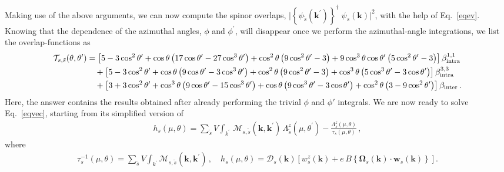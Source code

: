 \documentclass[aps,prb,onecolumn,nofootinbib,citeautoscript,10pt, showkeys]{revtex4-2}
\def \nn{\nonumber \\}
\begin{document}
Making use of the above arguments, we can now compute the spinor overlaps, $\big \vert \left \lbrace  \psi_{\tilde s }({ \boldsymbol k^\prime }) \right \rbrace^\dagger \; \psi_{s}({ \boldsymbol k}) \big \vert^2 $, with the help of Eq.~\eqref{eqev}. Knowing that the dependence of the azimuthal angles, $\phi$ and $\phi^\prime $, will disappear once we perform the azimuthal-angle integrations, we list the
overlap-functions as
\begin{align}
\label{eqoverlap}
{\mathcal T }_{ s, \tilde s} (\theta, \theta^\prime)
& = \left[  5 -3 \cos^2 \theta^\prime 
+ \cos  \theta  \left(17 \cos  \theta^\prime  -
27 \cos^3 \theta^\prime  \right)+\cos^2 \theta  
\left(9 \cos^2 \theta^\prime  -3\right) 
  +9 \cos^3 \theta  \cos  \theta^\prime   \left(5 \cos^2 \theta^\prime  -3\right)
    \right ] \beta_{\rm intra}^{1,1} \nn & \quad
+ \left[ 5 - 3\cos^2 \theta^\prime
+\cos  \theta  \left(9 \cos\theta^\prime  -3 \cos^3 \theta^\prime  \right)
+ \cos^2 \theta  \left(9 \cos^2 \theta^\prime  -3\right)
+ \cos^3 \theta  \left(5 \cos^3 \theta^\prime  -3 \cos  \theta^\prime  \right)  
\right ] \beta_{\rm intra}^{3,3} \nn & \quad
+ \left[ 3 + 3\cos^2 \theta^\prime  
+ \cos^3 \theta  \left(9 \cos  \theta^\prime  -15 \cos^3 \theta^\prime  \right)
+\cos  \theta  \left(9 \cos^3 \theta^\prime  -3 \cos  \theta^\prime  \right)
   +\cos^2 \theta  \left(3-9 \cos^2 \theta^\prime  \right)  
 \right ]  \beta_{\rm inter}\,.
\end{align}
Here, the answer contains the results obtained after already performing the trivial $\phi$ and $ \phi'$ integrals. We are now ready to solve Eq.~\eqref{eqvec}, starting from its simplified version of
\begin{align}
\label{eq_lambda_mu}
h_s (\mu, \theta) = 
 \sum_{\tilde s} V  
\int_{k^\prime }\, \mathcal{M}_{ s, \tilde s} 
(\boldsymbol k,\boldsymbol k^\prime)
\, {\Lambda}^z_{\tilde s} ( \mu, \theta^\prime ) 
 - \frac{ {\Lambda}^z_s  (\mu, \theta)} 
{\tau_s(\mu, \theta)}  \,,
\end{align}
where
\begin{align}
\label{eqtau}
\tau^{-1}_s(\mu, \theta)
= \sum_{\tilde s} V \int_{k^\prime }
\mathcal{M}_{ s, \tilde s} (\boldsymbol k,\boldsymbol k^\prime) \,, \quad
h_s (\mu, \theta) = {\mathcal D}_s ({\boldsymbol k})
 \left[ w^z_s ({\boldsymbol k})
+ e \, B \left \lbrace
{\boldsymbol \Omega}_s ({\boldsymbol k}) \cdot {\boldsymbol{w}}_s ({\boldsymbol k})
  \right \rbrace \right].	
\end{align}
\end{document}
